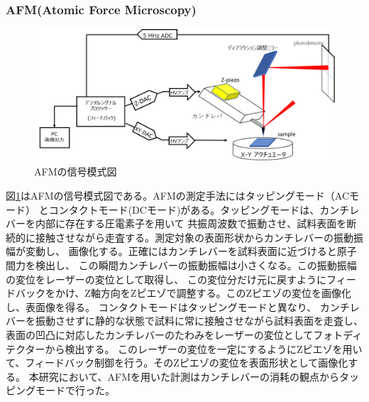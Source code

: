\documentclass[dvipdfmx,12pt,a4paper]{jreport}
\begin{document}
				\subsubsection{AFM(Atomic Force Microscopy)}
				\begin{figure}[h]
					\centering
					\includegraphics[width=0.8\linewidth]{AFM.png}
					\caption{AFMの信号模式図}
					\label{stracture_of_AFM}
				\end{figure}
				図\ref{stracture_of_AFM}はAFMの信号模式図である。AFMの測定手法にはタッピングモード（ACモード）
				とコンタクトモード(DCモード)がある。タッピングモードは、カンチレバーを内部に存在する圧電素子を用いて
				共振周波数で振動させ、試料表面を断続的に接触させながら走査する。測定対象の表面形状からカンチレバーの振動振幅が変動し、
				画像化する。正確にはカンチレバーを試料表面に近づけると原子間力を検出し、
				この瞬間カンチレバーの振動振幅は小さくなる。この振動振幅の変位をレーザーの変位として取得し、
				この変位分だけ元に戻すようにフィードバックをかけ、Z軸方向をZピエゾで調整する。このZピエゾの変位を画像化し、表面像を得る。
				コンタクトモードはタッピングモードと異なり、
				カンチレバーを振動させずに静的な状態で試料に常に接触させながら試料表面を走査し、
				表面の凹凸に対応したカンチレバーのたわみをレーザーの変位としてフォトディテクターから検出する。
				このレーザーの変位を一定にするようにZピエゾを用いて、フィードバック制御を行う。そのZピエゾの変位を表面形状として画像化する。
				本研究において、AFMを用いた計測はカンチレバーの消耗の観点からタッピングモードで行った。
\end{document}
